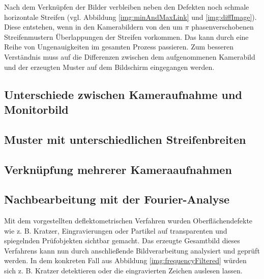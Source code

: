 Nach dem Verknüpfen der Bilder verbleiben neben den Defekten noch schmale horizontale Streifen (vgl. Abbildung \ref{img:minAndMaxLink} und \ref{img:diffImage}).
Diese entstehen, wenn in den Kamerabildern von den um $\pi$ phasenverschobenen Streifenmustern Überlappungen der Streifen vorkommen.
Das kann durch eine Reihe von Ungenauigkeiten im gesamten Prozess passieren.
Zum besseren Verständnis muss auf die Differenzen zwischen dem aufgenommenen Kamerabild und der erzeugten Muster auf dem Bildschirm eingegangen werden.

{
	\FloatBarrier
    \subsection{Unterschiede zwischen Kameraufnahme und Monitorbild}
    \label{sub:unterschiedeKameraUndMonitor}
    
}

{
	\FloatBarrier
    \subsection{Muster mit unterschiedlichen Streifenbreiten}
    \label{sub:musterUnterschiedlichenStreifenbreiten}
    
}

{
	\FloatBarrier
    \subsection{Verknüpfung mehrerer Kameraaufnahmen}
    \label{sub:verknuepfungMehrererKameraaufnahmen}
    
}

{
	\FloatBarrier
    \subsection{Nachbearbeitung mit der Fourier-Analyse}
    \label{sub:nachbearbeitungFourierAnalyse}
    
}

\noindent
Mit dem vorgestellten deflektometrischen Verfahren wurden Oberflächendefekte wie z. B. Kratzer, Eingravierungen oder Partikel auf transparenten und spiegelnden Prüfobjekten sichtbar gemacht.
Das erzeugte Gesamtbild dieses Verfahrens kann nun durch anschließende Bildverarbeitung analysiert und geprüft werden.
In dem konkreten Fall aus Abbildung \ref{img:frequencyFiltered} würden sich z. B. Kratzer detektieren oder die eingravierten Zeichen auslesen lassen.

